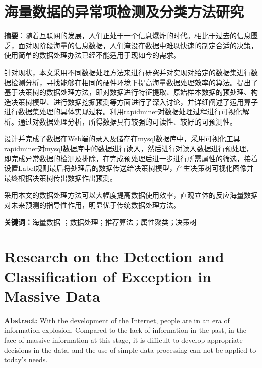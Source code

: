 \thispagestyle{empty} 
\section*{ \centering 海量数据的异常项检测及分类方法研究}
\vspace{0.5cm}

\noindent 
\textbf{摘\hspace{1em}要}：随着互联网的发展，人们正处于一个信息爆炸的时代。相比于过去的信息匮乏，面对现阶段海量的信息数据，人们淹没在数据中难以快速的制定合适的决策，使用简单的数据处理办法已经不能适用于现如今的需求。

 针对现状，本文采用不同数据处理方法来进行研究并对实现对给定的数据集进行数据检测分析，寻找能够在相同的硬件环境下提高海量数据处理效率的算法。提出了基于决策树的数据处理方法，即对数据进行特征提取、原始样本数据的预处理、构造决策树模型、进行数据挖掘预测等方面进行了深入讨论，并详细阐述了运用算子进行数据集处理的具体实现过程。利用rapidminer对数据处理过程进行可视化解析。通过对数据处理分析，所得数据具有较强的可读性、较好的可预测性。

设计并完成了数据在Web端的录入及储存在mysql数据库中，采用可视化工具rapidminer对mysql数据库中的数据进行读入，然后进行对读入数据进行预处理，即完成异常数据的检测及排除，在完成预处理后进一步进行所需属性的筛选，接着设置Label规则最后将处理后的数据传送给决策树模型，产生决策树可视化图像并最终根据决策树传出数据作出预测。

采用本文的数据处理方法可以大幅度提高数据使用效率，直观立体的反应海量数据对未来预测的指导性作用，明显优于传统数据处理方法。

\vspace{0.5cm}
\noindent
\textbf{关键词：}海量数据 ；数据处理；推荐算法；属性聚类；决策树

\clearpage

\thispagestyle{empty} 
\section*{\songti{} \centering \textbf{Research on the Detection and Classification of Exception in Massive Data
}}

\noindent 
\textbf{Abstract: }With the development of the Internet, people are in an era of information explosion. Compared to the lack of information in the past, in the face of massive information at this stage, it is difficult to develop appropriate decisions in the data, and the use of simple data processing can not be applied to today's needs.



